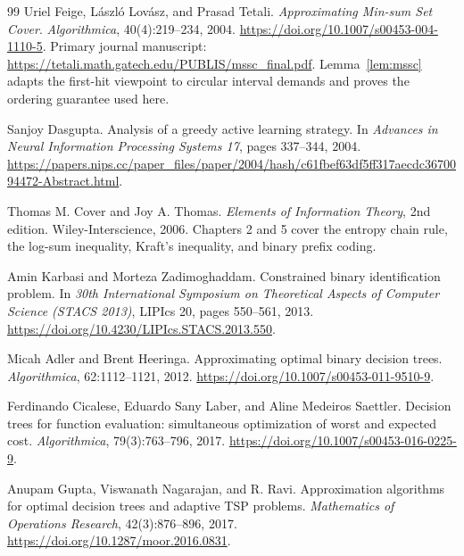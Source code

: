 \begingroup
\small
{}
{}
\begin{thebibliography}{99}
\setlength{\itemsep}{2pt}
Uriel Feige, L\'aszl\'o Lov\'asz, and Prasad Tetali.
\newblock \emph{Approximating Min-sum Set Cover}.
\newblock \emph{Algorithmica}, 40(4):219--234, 2004.
\newblock \url{https://doi.org/10.1007/s00453-004-1110-5}.
\newblock Primary journal manuscript:
\url{https://tetali.math.gatech.edu/PUBLIS/mssc_final.pdf}.
\newblock Lemma~\ref{lem:mssc} adapts the first-hit viewpoint to
circular interval demands and proves the ordering guarantee used here.

Sanjoy Dasgupta.
\newblock Analysis of a greedy active learning strategy.
\newblock In \emph{Advances in Neural Information Processing Systems 17},
pages 337--344, 2004.
\newblock \url{https://papers.nips.cc/paper_files/paper/2004/hash/c61fbef63df5ff317aecdc3670094472-Abstract.html}.

Thomas M. Cover and Joy A. Thomas.
\newblock \emph{Elements of Information Theory}, 2nd edition.
\newblock Wiley-Interscience, 2006.
\newblock Chapters 2 and 5 cover the entropy chain rule, the
log-sum inequality, Kraft's inequality, and binary prefix coding.

Amin Karbasi and Morteza Zadimoghaddam.
\newblock Constrained binary identification problem.
\newblock In \emph{30th International Symposium on Theoretical Aspects
of Computer Science (STACS 2013)}, LIPIcs 20, pages 550--561, 2013.
\newblock \url{https://doi.org/10.4230/LIPIcs.STACS.2013.550}.

Micah Adler and Brent Heeringa.
\newblock Approximating optimal binary decision trees.
\newblock \emph{Algorithmica}, 62:1112--1121, 2012.
\newblock \url{https://doi.org/10.1007/s00453-011-9510-9}.

Ferdinando Cicalese, Eduardo Sany Laber, and Aline Medeiros Saettler.
\newblock Decision trees for function evaluation: simultaneous
optimization of worst and expected cost.
\newblock \emph{Algorithmica}, 79(3):763--796, 2017.
\newblock \url{https://doi.org/10.1007/s00453-016-0225-9}.

Anupam Gupta, Viswanath Nagarajan, and R. Ravi.
\newblock Approximation algorithms for optimal decision trees and
adaptive TSP problems.
\newblock \emph{Mathematics of Operations Research}, 42(3):876--896,
2017.
\newblock \url{https://doi.org/10.1287/moor.2016.0831}.


\end{thebibliography}

